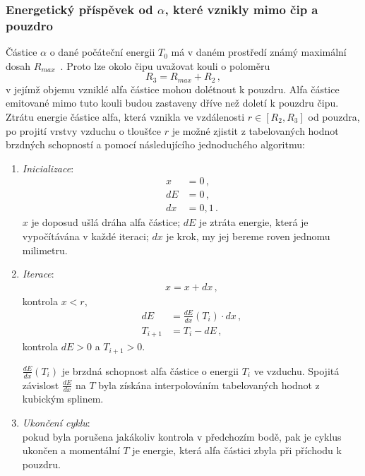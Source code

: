 \documentclass[11pt,a4paper]{article}
\begin{document}
\subsubsection{Energetický příspěvek od $\alpha$, které vznikly mimo čip a pouzdro}
Částice $\alpha$ o dané počáteční energii $T_0$ má v daném prostředí známý maximální dosah $R_{max}$~\cite{astar}. Proto lze okolo čipu uvažovat kouli o poloměru 
$$R_3=R_{max}+R_2\,,$$
v jejímž objemu vzniklé alfa částice mohou dolétnout k pouzdru. Alfa částice emitované mimo tuto kouli budou zastaveny dříve než doletí k pouzdru čipu. Ztrátu energie částice alfa, která vznikla ve vzdálenosti $r\in[R_2, R_3]$ od pouzdra, po projití vrstvy vzduchu o tloušťce $r$ je možné zjistit z tabelovaných hodnot brzdných schopností \cite{astar} a pomocí následujícího jednoduchého algoritmu:
\begin{enumerate}
	\item \emph{Inicializace}:
	\begin{align*}
	x&=0\,,\\
	  dE&=0\,,\\
	   dx&=0,1\,.
	   \end{align*}
	  $x$ je doposud ušlá dráha alfa částice; $dE$ je ztráta energie, která je vypočítávána v každé iteraci; $dx$ je krok, my jej bereme roven jednomu milimetru.
	\item \emph{Iterace}:
	\begin{align}
		x = x+dx\,,
	\end{align}
	kontrola $x<r$,
	\begin{align*}
	dE &= \frac{dE}{dx}(T_i)\cdot dx\,,\\    
	T_{i+1} &= T_i - dE\,,
	\end{align*}  
	kontrola $dE>0$ a $T_{i+1}>0$. 

$\frac{dE}{dx}(T_i)$ je brzdná schopnost alfa částice o energii $T_i$ ve vzduchu. Spojitá závislost $\frac{dE}{dx}$ na $T$ byla získána interpolováním tabelovaných hodnot z~\cite{astar} kubickým splinem.
\item \emph{Ukončení cyklu}:\\
pokud byla porušena jakákoliv kontrola v předchozím bodě, pak je cyklus ukončen a momentální $T$ je energie, která alfa částici zbyla při příchodu k pouzdru.
\end{enumerate}
\end{document}
